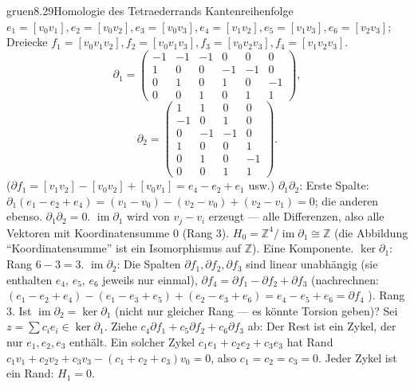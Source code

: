 \begin{loesungkarte}{gruen}{8.29}{Homologie des Tetraederrands}
Kantenreihenfolge $e_1 = [v_0v_1], e_2 = [v_0v_2], e_3 = [v_0v_3], e_4 = [v_1v_2], e_5 = [v_1v_3], e_6 = [v_2v_3]$; Dreiecke $f_1 = [v_0v_1v_2], f_2 = [v_0v_1v_3], f_3 = [v_0v_2v_3], f_4 = [v_1v_2v_3]$.
\[ \partial_1 = \begin{pmatrix}-1&-1&-1&0&0&0\\1&0&0&-1&-1&0\\0&1&0&1&0&-1\\0&0&1&0&1&1\end{pmatrix}, \]
\[ \partial_2 = \begin{pmatrix}1&1&0&0\\-1&0&1&0\\0&-1&-1&0\\1&0&0&1\\0&1&0&-1\\0&0&1&1\end{pmatrix}. \]
($\partial f_1 = [v_1v_2] - [v_0v_2] + [v_0v_1] = e_4 - e_2 + e_1$ usw.) $\partial_1\partial_2$: Erste Spalte: $\partial_1(e_1 - e_2 + e_4) = (v_1 - v_0) - (v_2 - v_0) + (v_2 - v_1) = 0$; die anderen ebenso. $\partial_1\partial_2 = 0$. \checkmark
{}
$\operatorname{im}\partial_1$ wird von $v_j - v_i$ erzeugt --- alle Differenzen, also alle Vektoren mit Koordinatensumme $0$ (Rang $3$). $H_0 = \mathbb Z^{4}/\operatorname{im}\partial_1\cong\mathbb Z$ (die Abbildung \enquote{Koordinatensumme} ist ein Isomorphismus auf $\mathbb Z$). Eine Komponente.
$\ker\partial_1$: Rang $6 - 3 = 3$. $\operatorname{im}\partial_2$: Die Spalten $\partial f_1, \partial f_2, \partial f_3$ sind linear unabhängig (sie enthalten $e_4$, $e_5$, $e_6$ jeweils nur einmal), $\partial f_4 = \partial f_1 - \partial f_2 + \partial f_3$ (nachrechnen: $(e_1 - e_2 + e_4) - (e_1 - e_3 + e_5) + (e_2 - e_3 + e_6) = e_4 - e_5 + e_6 = \partial f_4$ \checkmark). Rang $3$. Ist $\operatorname{im}\partial_2 = \ker\partial_1$ (nicht nur gleicher Rang --- es könnte Torsion geben)? Sei $z = \sum c_ie_i\in\ker\partial_1$. Ziehe $c_4\partial f_1 + c_5\partial f_2 + c_6\partial f_3$ ab: Der Rest ist ein Zykel, der nur $e_1, e_2, e_3$ enthält. Ein solcher Zykel $c_1e_1 + c_2e_2 + c_3e_3$ hat Rand $c_1v_1 + c_2v_2 + c_3v_3 - (c_1 + c_2 + c_3)v_0 = 0$, also $c_1 = c_2 = c_3 = 0$. Jeder Zykel ist ein Rand: $H_1 = 0$. \checkmark

\end{loesungkarte}
